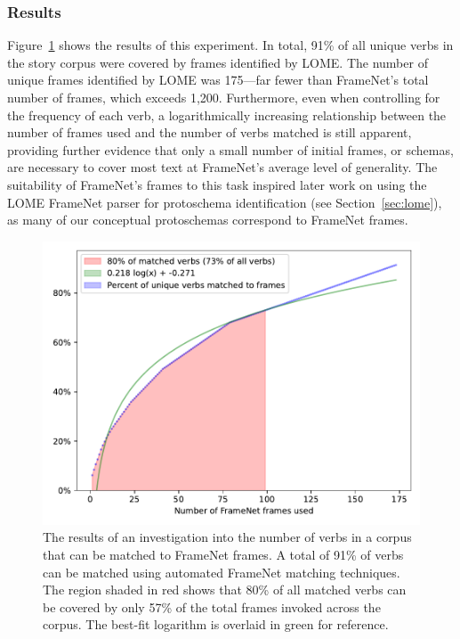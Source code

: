 \subsubsection{Results}
Figure~\ref{fig:fn_coverage} shows the results of this experiment. In total, 91\% of all unique verbs in the story corpus were covered by frames identified by LOME. The number of unique frames identified by LOME was 175---far fewer than FrameNet's total number of frames, which exceeds 1,200. Furthermore, even when controlling for the frequency of each verb, a logarithmically increasing relationship between the number of frames used and the number of verbs matched is still apparent, providing further evidence that only a small number of initial frames, or schemas, are necessary to cover most text at FrameNet's average level of generality. The suitability of FrameNet's frames to this task inspired later work on using the LOME FrameNet parser for protoschema identification (see Section~\ref{sec:lome}), as many of our conceptual protoschemas correspond to FrameNet frames.

\begin{figure}
    \centering
    \includegraphics[width=0.75\columnwidth]{CH3_schemas/framenet_coverage}
    \caption{The results of an investigation into the number of verbs in a corpus that can be matched to FrameNet frames. A total of 91\% of verbs can be matched using automated FrameNet matching techniques. The region shaded in red shows that 80\% of all matched verbs can be covered by only 57\% of the total frames invoked across the corpus. The best-fit logarithm is overlaid in green for reference.}
    \label{fig:fn_coverage}
\end{figure}

